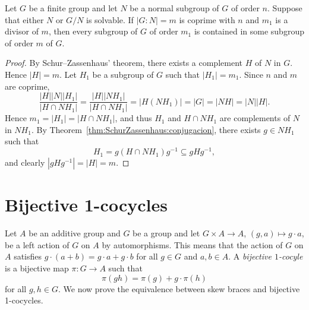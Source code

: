\begin{corollary}
	Let $G$ be a finite group and let $N$ be a normal subgroup of $G$ of order $n$.
	Suppose that either $N$ or $G/N$ is solvable. If $|G:N|=m$ is coprime with $n$ and
	$m_1$ is a divisor of $m$, then every subgroup of $G$ of order $m_1$ is contained in some subgroup of order $m$ of $G$.
\end{corollary}

\begin{proof}
	By Schur--Zassenhaus' theorem, there exists a complement $H$ of $N$ in $G$. Hence $|H|=m$. Let $H_1$ be a subgroup of $G$ such that $|H_1|=m_1$. 
	Since $n$ and $m$ are coprime, 
	\[
	\frac{|H||N||H_1|}{|H\cap NH_1|}=
	\frac{|H||NH_1|}{|H\cap NH_1|}=|H(NH_1)|=|G|=|NH|=|N||H|.
	\]
	Hence $m_1=|H_1|=|H\cap NH_1|$, and thus $H_1$ and $H\cap NH_1$ are complements of $N$ in $NH_1$. By Theorem~\ref{thm:SchurZassenhaus:conjugacion}, there exists $g\in NH_1$ such that 
	\[
	H_1=g(H\cap NH_1)g^{-1}\subseteq gHg^{-1},
	\]
	and clearly $|gHg^{-1}|=|H|=m$. 
\end{proof}

\section{Bijective 1-cocycles}

Let $A$ be an additive group and $G$ be a group and let 
$G\times A\to A$, $(g,a)\mapsto g\cdot a$,
be a left action of $G$ on $A$ by automorphisms. This means that the action of $G$ on $A$ satisfies 
$g\cdot (a+b)=g\cdot a+g\cdot b$ for all $g\in G$ and $a,b\in A$.
A \emph{bijective
$1$-cocyle} is a bijective map $\pi\colon G\to A$ such that 
\begin{equation}
    \label{eq:1cocycle}
    \pi(gh)=\pi(g)+g\cdot \pi(h)
\end{equation}
for all $g,h\in G$. 
We now prove the equivalence between skew braces and bijective 1-cocycles. 

